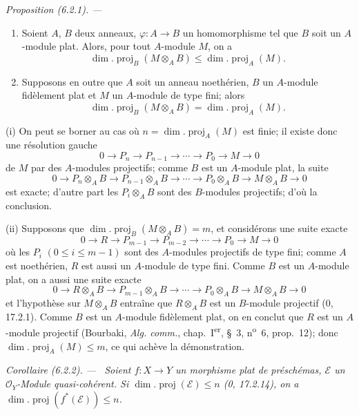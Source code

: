 \documentclass[10pt,oneside]{book}
\newenvironment{proposition}[1][]{%
  \par\medskip\noindent\itshape Proposition (#1). ---\ }{\par}
\newenvironment{corollary}[1][]{%
  \par\medskip\noindent\itshape Corollaire (#1). ---\ }{\par}
\begin{document}
\begin{proposition}[6.2.1]
\label{IV.2.s6.2.1-fr}
\begin{enumerate}
\item[(i)] Soient $A$, $B$ deux anneaux, $\varphi:A\to B$ un homomorphisme tel
que $B$ soit un $A$-module plat. Alors, pour tout $A$-module $M$, on a
\begin{equation}
\dim.\operatorname{proj}_B(M\otimes_AB)
\leq\dim.\operatorname{proj}_A(M).
\tag{6.2.1.1}\label{IV.2.s6.2.1.1-fr}
\end{equation}
\item[(ii)] Supposons en outre que $A$ soit un anneau noethérien, $B$ un
$A$-module fidèlement plat et $M$ un $A$-module de type fini; alors
\begin{equation}
\dim.\operatorname{proj}_B(M\otimes_AB)
=\dim.\operatorname{proj}_A(M).
\tag{6.2.1.2}\label{IV.2.s6.2.1.2-fr}
\end{equation}
\end{enumerate}
\end{proposition}

(i) On peut se borner au cas où
$n=\dim.\operatorname{proj}_A(M)$ est finie; il existe donc une résolution
gauche
\[
0\to P_n\to P_{n-1}\to\cdots\to P_0\to M\to0
\]
de $M$ par des $A$-modules projectifs; comme $B$ est un $A$-module plat, la
suite
\[
0\to P_n\otimes_AB\to P_{n-1}\otimes_AB\to\cdots\to
P_0\otimes_AB\to M\otimes_AB\to0
\]
est exacte; d'autre part les $P_i\otimes_AB$ sont des $B$-modules projectifs;
d'où la conclusion.

(ii) Supposons que $\dim.\operatorname{proj}_B(M\otimes_AB)=m$, et considérons
une suite exacte
\[
0\to R\to P_{m-1}\to P_{m-2}\to\cdots\to P_0\to M\to0
\]
où les $P_i$ $(0\leq i\leq m-1)$ sont des $A$-modules projectifs de type fini;
comme $A$ est noethérien, $R$ est aussi un $A$-module de type fini. Comme $B$
est un $A$-module plat, on a aussi une suite exacte
\[
0\to R\otimes_AB\to P_{m-1}\otimes_AB\to\cdots\to
P_0\otimes_AB\to M\otimes_AB\to0
\]
et l'hypothèse sur $M\otimes_AB$ entraîne que $R\otimes_AB$ est un $B$-module
projectif (0, 17.2.1). Comme $B$ est un $A$-module fidèlement plat, on en
conclut que $R$ est un $A$-module projectif (Bourbaki, \emph{Alg. comm.},
chap.~I\textsuperscript{er}, §~3, n\textsuperscript{o}~6, prop.~12); donc
$\dim.\operatorname{proj}_A(M)\leq m$, ce qui achève la démonstration.

\begin{corollary}[6.2.2]
\label{IV.2.s6.2.2-fr}
Soient $f:X\to Y$ un morphisme plat de préschémas, $\mathscr E$ un
$\mathcal O_Y$-Module quasi-cohérent. Si
$\dim.\operatorname{proj}(\mathscr E)\leq n$ (0, 17.2.14), on a
$\dim.\operatorname{proj}(f^*(\mathscr E))\leq n$.
\end{corollary}
\end{document}

